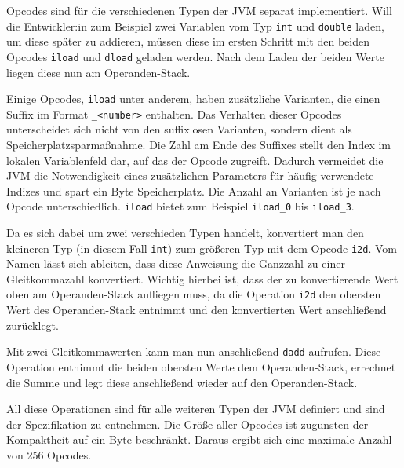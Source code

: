 Opcodes sind für die verschiedenen Typen der JVM separat implementiert. Will die Entwickler:in zum Beispiel zwei Variablen vom Typ \texttt{int} und \texttt{double} laden, um diese später zu addieren, müssen diese im ersten Schritt mit den beiden Opcodes \texttt{iload} und \texttt{dload} geladen werden. Nach dem Laden der beiden Werte liegen diese nun am Operanden-Stack.

Einige Opcodes, \texttt{iload} unter anderem, haben zusätzliche Varianten, die einen Suffix im Format \texttt{\_<number>} enthalten. Das Verhalten dieser Opcodes unterscheidet sich nicht von den suffixlosen Varianten, sondern dient als Speicherplatzsparmaßnahme. Die Zahl am Ende des Suffixes stellt den Index im lokalen Variablenfeld dar, auf das der Opcode zugreift. Dadurch vermeidet die JVM die Notwendigkeit eines zusätzlichen Parameters für häufig verwendete Indizes und spart ein Byte Speicherplatz.  Die Anzahl an Varianten ist je nach Opcode unterschiedlich. \texttt{iload} bietet zum Beispiel \texttt{iload\_0} bis \texttt{iload\_3}. 

Da es sich dabei um zwei verschieden Typen handelt, konvertiert man den kleineren Typ (in diesem Fall \texttt{int}) zum größeren Typ mit dem Opcode \texttt{i2d}. Vom Namen lässt sich ableiten, dass diese Anweisung die Ganzzahl zu einer Gleitkommazahl konvertiert. Wichtig hierbei ist, dass der zu konvertierende Wert oben am Operanden-Stack aufliegen muss, da die Operation \texttt{i2d} den obersten Wert des Operanden-Stack entnimmt und den konvertierten Wert anschließend zurücklegt.

Mit zwei Gleitkommawerten kann man nun anschließend \texttt{dadd} aufrufen. Diese Operation entnimmt die beiden obersten Werte dem Operanden-Stack, errechnet die Summe und legt diese anschließend wieder auf den Operanden-Stack.

All diese Operationen sind für alle weiteren Typen der JVM definiert und sind der Spezifikation zu entnehmen. Die Größe aller Opcodes ist zugunsten der Kompaktheit auf ein Byte beschränkt. Daraus ergibt sich eine maximale Anzahl von 256 Opcodes.